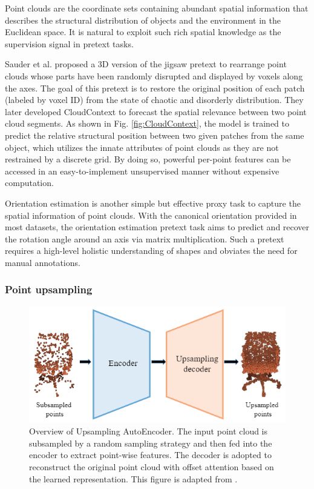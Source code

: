 \documentclass[a4paper,fleqn]{cas-dc}
\begin{document}
Point clouds are the coordinate sets containing abundant spatial information that describes the structural distribution of objects and the environment in the Euclidean space. It is natural to exploit such rich spatial knowledge as the supervision signal in pretext tasks. 


Sauder et al. \citep{sauder2019self} proposed a 3D version of the jigsaw pretext to rearrange point clouds whose parts have been randomly disrupted and displayed by voxels along the axes. The goal of this pretext is to restore the original position of each patch (labeled by voxel ID) from the state of chaotic and disorderly distribution. They later developed CloudContext \citep{sauder2019context} to forecast the spatial relevance between two point cloud segments. As shown in Fig. \ref{fig:CloudContext}, the model is trained to predict the relative structural position between two given patches from the same object, which utilizes the innate attributes of point clouds as they are not restrained by a discrete grid. By doing so, powerful per-point features can be accessed in an easy-to-implement unsupervised manner without expensive computation. 

Orientation estimation \citep{poursaeed2020self} is another simple but effective proxy task to capture the spatial information of point clouds. With the canonical orientation provided in most datasets, the orientation estimation pretext task aims to predict and recover the rotation angle around an axis via matrix multiplication. Such a pretext requires a high-level holistic understanding of shapes and obviates the need for manual annotations.


\subsubsection{Point upsampling}
\begin{figure}[htbp]
    \centering
    \includegraphics[width=0.97\linewidth]{UAE.png}
    \caption{Overview of Upsampling AutoEncoder. The input point cloud is subsampled by a random sampling strategy and then fed into the encoder to extract point-wise features. The decoder is adopted to reconstruct the original point cloud with offset attention based on the learned representation. This figure is adapted from \citep{zhang2022upsampling}.}
    \label{fig:UAE}
\end{figure}
\end{document}
